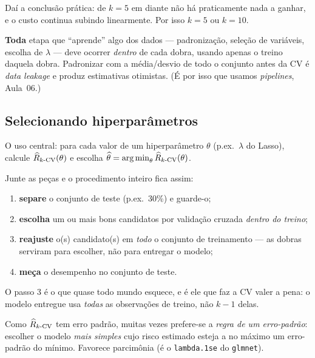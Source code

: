 \documentclass[11pt,a4paper]{article}
\begin{document}
\noindent Daí a conclusão prática: de $k=5$ em diante não há praticamente nada a
ganhar, e o custo continua subindo linearmente. Por isso $k=5$ ou $k=10$.

\begin{atencao}
\textbf{Toda} etapa que ``aprende'' algo dos dados --- padronização, seleção de
variáveis, escolha de $\lambda$ --- deve ocorrer \emph{dentro} de cada dobra,
usando apenas o treino daquela dobra. Padronizar com a média/desvio de todo o
conjunto antes da CV é \emph{data leakage} e produz estimativas otimistas. (É por
isso que usamos \emph{pipelines}, Aula~06.)
\end{atencao}

\subsection{Selecionando hiperparâmetros}
O uso central: para cada valor de um hiperparâmetro $\theta$ (p.ex.\ $\lambda$ do
Lasso), calcule $\widehat{R}_{k\text{-CV}}(\theta)$ e escolha
$\widehat\theta=\argmin_\theta \riscohat_{k\text{-CV}}(\theta)$.

\begin{ideia}
Junte as peças e o procedimento inteiro fica assim:
\begin{enumerate}[leftmargin=1.6cm,nosep]
  \item \textbf{separe} o conjunto de teste (p.ex.\ 30\%) e guarde-o;
  \item \textbf{escolha} um ou mais bons candidatos por validação cruzada
        \emph{dentro do treino};
  \item \textbf{reajuste} o(s) candidato(s) em \emph{todo} o conjunto de
        treinamento --- as dobras serviram para escolher, não para entregar o
        modelo;
  \item \textbf{meça} o desempenho no conjunto de teste.
\end{enumerate}
O passo 3 é o que quase todo mundo esquece, e é ele que faz a CV valer a pena: o
modelo entregue usa \emph{todas} as observações de treino, não $k-1$ delas.
\end{ideia}

\begin{atencao}[Regra ``1-EP'']
Como $\widehat{R}_{k\text{-CV}}$ tem erro padrão, muitas vezes prefere-se a
\emph{regra de um erro-padrão}: escolher o modelo \emph{mais simples} cujo risco
estimado esteja a no máximo um erro-padrão do mínimo. Favorece parcimônia
(é o \texttt{lambda.1se} do \texttt{glmnet}).
\end{atencao}
\end{document}
